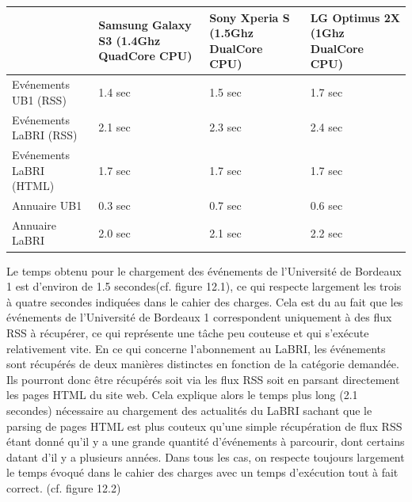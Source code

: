 \begin{table}[h]
\begin{adjustbox}{minipage=1.12\textwidth,margin=0pt \smallskipamount,center}
\begin{tabular}{|l|p{2.8cm}|p{2.8cm}|p{2.8cm}|}
	\hline
	~ & Samsung Galaxy S3 (1.4Ghz QuadCore CPU) & Sony Xperia S (1.5Ghz DualCore CPU) & LG Optimus 2X (1Ghz DualCore CPU) \\ \hline
	Evénements UB1 (RSS) & 1.4 sec & 1.5 sec & 1.7 sec \\ \hline
	Evénements LaBRI (RSS) & 2.1 sec & 2.3 sec & 2.4 sec \\ \hline
	Evénements LaBRI (HTML) & 1.7 sec & 1.7 sec & 1.7 sec \\ \hline
	Annuaire UB1 & 0.3 sec & 0.7 sec & 0.6 sec \\ \hline
	Annuaire LaBRI & 2.0 sec & 2.1 sec & 2.2 sec \\ \hline
\end{tabular}
\end{adjustbox}
\end{table}

Le temps obtenu pour le chargement des événements de l'Université de Bordeaux 1 est d'environ de 1.5 secondes(cf. figure 12.1), ce qui respecte largement les trois à quatre secondes indiquées dans le cahier des charges. Cela est du au fait que les événements de l'Université de Bordeaux 1 correspondent uniquement à des flux RSS à récupérer, ce qui représente une tâche peu couteuse et qui s'exécute relativement vite.
En ce qui concerne l'abonnement au LaBRI, les événements sont récupérés de deux manières distinctes en fonction de la catégorie demandée. Ils pourront donc être récupérés soit via les flux RSS soit en parsant directement les pages HTML du site web. Cela explique alors le temps plus long (2.1 secondes) nécessaire au chargement des actualités du LaBRI sachant que le parsing de pages HTML est plus couteux qu'une simple récupération de flux RSS étant donné qu'il y a une grande quantité d'événements à parcourir, dont certains datant d'il y a plusieurs années. Dans tous les cas, on respecte toujours largement le temps évoqué dans le cahier des charges avec un temps d'exécution tout à fait correct. (cf. figure 12.2)\\\\
 

